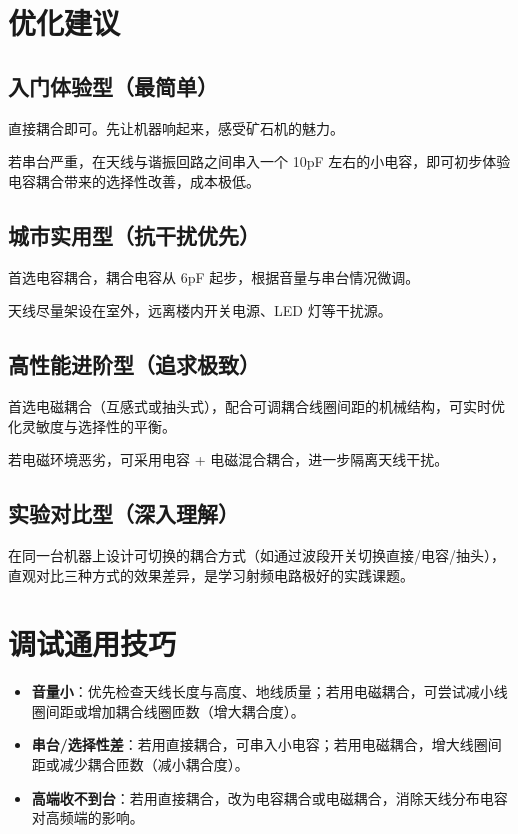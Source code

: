 \documentclass[12pt,UTF8]{ctexbook}
\begin{document}
\section{优化建议}

\subsection{入门体验型（最简单）}

直接耦合即可。先让机器响起来，感受矿石机的魅力。

若串台严重，在天线与谐振回路之间串入一个 10pF 左右的小电容，即可初步体验电容耦合带来的选择性改善，成本极低。

\subsection{城市实用型（抗干扰优先）}

首选电容耦合，耦合电容从 6pF 起步，根据音量与串台情况微调。

天线尽量架设在室外，远离楼内开关电源、LED 灯等干扰源。

\subsection{高性能进阶型（追求极致）}

首选电磁耦合（互感式或抽头式），配合可调耦合线圈间距的机械结构，可实时优化灵敏度与选择性的平衡。

若电磁环境恶劣，可采用电容 + 电磁混合耦合，进一步隔离天线干扰。

\subsection{实验对比型（深入理解）}

在同一台机器上设计可切换的耦合方式（如通过波段开关切换直接/电容/抽头），直观对比三种方式的效果差异，是学习射频电路极好的实践课题。

\section{调试通用技巧}

\begin{itemize}[leftmargin=2cm]
	\item \textbf{音量小}：优先检查天线长度与高度、地线质量；若用电磁耦合，可尝试减小线圈间距或增加耦合线圈匝数（增大耦合度）。
	\item \textbf{串台/选择性差}：若用直接耦合，可串入小电容；若用电磁耦合，增大线圈间距或减少耦合匝数（减小耦合度）。
	\item \textbf{高端收不到台}：若用直接耦合，改为电容耦合或电磁耦合，消除天线分布电容对高频端的影响。
\end{itemize}
\end{document}
